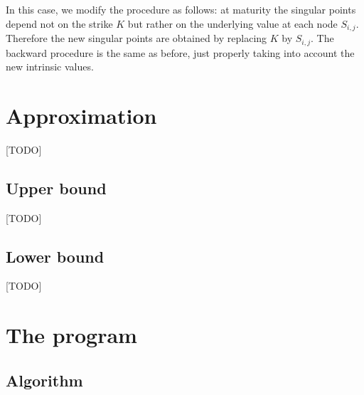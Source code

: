 \begin{rem}[Floating]
	In this case, we modify the procedure as follows: at maturity the singular points depend not on the strike $ K $ but rather on the underlying value at each node $ S_{i,j} $. Therefore the new singular points are obtained by replacing $ K $ by $ S_{i,j} $. The backward procedure is the same as before, just properly taking into account the new intrinsic values.
\end{rem}


\section{Approximation}
[TODO]

\subsection{Upper bound}
\label{subsec:asian-ub}
[TODO]

\subsection{Lower bound}
\label{subsec:asian-lb}
[TODO]



\clearpage
\section{The program}
\label{sec:asian-program}

\subsection{Algorithm}

